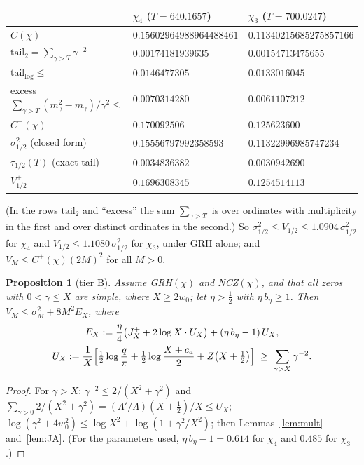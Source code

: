 \documentclass[11pt]{amsart}
\newtheorem{proposition}[theorem]{Proposition}
\theoremstyle{definition}
\numberwithin{equation}{section}
\begin{document}
\begin{center}
\begin{tabular}{lll}
\toprule
 & $\chi_4$ ($T=640.1657$) & $\chi_3$ ($T=700.0247$)\\
\midrule
$C(\chi)$ & $0.15602964988964488461$ & $0.11340215685275857166$\\
$\mathrm{tail}_2=\sum_{\gamma>T}\gamma^{-2}$ & $0.00174181939635$ &
$0.00154713475655$\\
$\mathrm{tail}_{\log}\le$ & $0.0146477305$ & $0.0133016045$\\
excess $\sum_{\gamma>T}(m_\gamma^2-m_\gamma)/\gamma^2\le$ &
$0.0070314280$ & $0.0061107212$\\
$C^+(\chi)$ & $0.170092506$ & $0.125623600$\\
$\sigma_{1/2}^2$ (closed form) & $0.15556797992358593$ &
$0.11322996985747234$\\
$\tau_{1/2}(T)$ (exact tail) & $0.0034836382$ & $0.0030942690$\\
$V_{1/2}^+$ & $\mathbf{0.1696308345}$ & $\mathbf{0.1254514113}$\\
\bottomrule
\end{tabular}
\end{center}

\noindent(In the rows $\mathrm{tail}_2$ and ``excess'' the sum
$\sum_{\gamma>T}$ is over ordinates with multiplicity in the first
and over distinct ordinates in the second.) So
$\sigma_{1/2}^2\le V_{1/2}\le1.0904\,\sigma_{1/2}^2$ for $\chi_4$ and
$V_{1/2}\le1.1080\,\sigma_{1/2}^2$ for $\chi_3$, under GRH alone; and
$V_M\le C^+(\chi)(2M)^2$ for all $M>0$.

\begin{proposition}[tier B]\label{prop:tierB}
Assume GRH$(\chi)$ and NCZ$(\chi)$, and that all zeros with
$0<\gamma\le X$ are simple, where $X\ge2w_0$; let $\eta>\tfrac12$
with $\eta\,b_\eta\ge1$. Then $V_M\le\sigma_M^2+8M^2E_X$, where
\begin{gather*}
E_X:=\frac\eta4\bigl(J_X^++2\log X\cdot U_X\bigr)+(\eta\,b_\eta-1)\,U_X,\\
U_X:=\frac1X\Bigl[\tfrac12\log\frac q\pi
+\tfrac12\log\frac{X+c_a}2+Z\bigl(X+\tfrac12\bigr)\Bigr]
\;\ge\;\sum_{\gamma>X}\gamma^{-2}.
\end{gather*}
\end{proposition}

\begin{proof}
For $\gamma>X$: $\gamma^{-2}\le2/(X^2+\gamma^2)$ and
$\sum_{\gamma>0}2/(X^2+\gamma^2)
=(\Lambda'/\Lambda)(X+\tfrac12)/X\le U_X$;
$\log(\gamma^2+4w_0^2)\le\log X^2+\log(1+\gamma^2/X^2)$; then
Lemmas~\ref{lem:mult} and~\ref{lem:JA}. (For the parameters used,
$\eta\,b_\eta-1=0.614$ for $\chi_4$ and $0.485$ for $\chi_3$.)
\end{proof}
\end{document}

